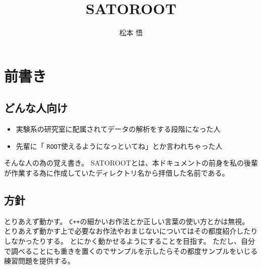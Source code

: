 \documentclass{jarticle}
\begin{document}
\title{\Huge SATOROOT}
\author{松本 悟}
\maketitle


\pagestyle{fancy}
\fancyhead{}
\fancyhead[RO,RE]{\rightmark}
\fancyhead[LE,LO]{\leftmark}
\cfoot{\thepage}

\newcommand{\ROOT}{\texttt{ROOT}}
\newcommand{\Cpp}{\texttt{C++}}
\newcommand{\pard}[3]{\frac{\partial^{#1} {#2}}{\partial {#3}^{#1}}}



\tableofcontents

\clearpage
\setcounter{section}{-1} %
 \section{前書き}


  \subsection{どんな人向け}
  \begin{itemize}
   \item 実験系の研究室に配属されてデータの解析をする段階になった人
   \item 先輩に「 \ROOT 使えるようになっといてね」とか言われちゃった人
  \end{itemize}
  そんな人の為の覚え書き。
  SATOROOTとは、本ドキュメントの前身を私の後輩が作業する為に作成していたディレクトリ名から拝借した名前である。


  \subsection{方針}
  とりあえず動かす。
  \Cpp の細かいお作法とか正しい言葉の使い方とかは無視。
  とりあえず動かす上で必要なお作法やおまじないについてはその都度紹介したりしなかったりする。
  とにかく動かせるようにすることを目指す。
  ただし、自分で調べることにも重きを置くのでサンプルを示したらその都度サンプルをいじる練習問題を提供する。
\end{document}
